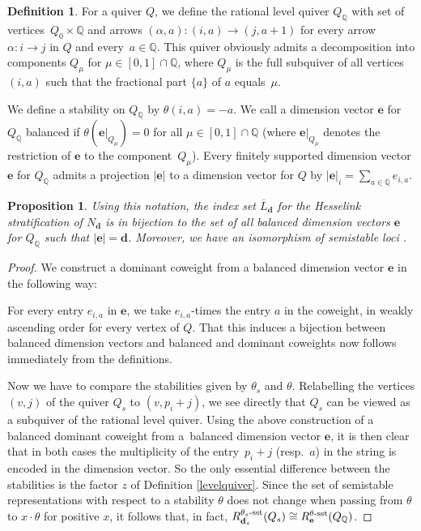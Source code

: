 \documentclass[pdftex]{sigma}
\numberwithin{equation}{section}
\newtheorem{Proposition}[Theorem]{Proposition}
\theoremstyle{definition}
\newtheorem{Definition}[Theorem]{Definition}
\begin{document}
\begin{Definition}
For a quiver $Q$, we define the rational level quiver $Q_{\mathbb{Q}}$ with set of vertices~${Q_0 \times \mathbb{Q}}$ and arrows
$
(\alpha, a) \colon (i,a) \rightarrow (j, a+1)
$
for every arrow~${\alpha\colon i \rightarrow j}$ in $Q$ and every~${a \in \mathbb{Q}}$. This quiver obviously admits a decomposition into components $Q_{\mu}$ for $\mu \in [0,1] \cap \mathbb{Q}$, where $Q_{\mu}$ is the full subquiver of all vertices $(i,a)$ such that the fractional part $\{a\}$ of $a$ equals~$\mu$.

We define a stability on $Q_{\mathbb{Q}}$ by $\theta(i,a) = -a$.
We call a dimension vector $\mathbf{e}$ for $Q_\mathbb{Q}$ balanced if $\theta(\mathbf{e}|_{Q_\mu})=0$
for all $\mu\in[0,1]\cap\mathbb{Q}$ (where $\mathbf{e}|_{Q_\mu}$ denotes the restriction of $\mathbf{e}$ to the component~$Q_\mu$). Every finitely supported dimension vector $\mathbf{e}$ for $Q_\mathbb{Q}$ admits a projection $|\mathbf{e}|$ to a dimension vector for $Q$ by $|\mathbf{e}|_i=\sum_{a\in\mathbb{Q}}e_{i,a}.$
\end{Definition}

\begin{Proposition}\label{pro par1}
Using this notation, the index set ${\overline{L}_{\mathbf{d}}}$ for the Hesselink stratification of $N_{\mathbf{d}}$ is in bijection to the set of all balanced dimension vectors $\mathbf{e}$ for $Q_\mathbb{Q}$ such that $|\mathbf{e}|=\mathbf{d}$. Moreover, we have an isomorphism of semistable loci .
\end{Proposition}

\begin{proof}
We construct a dominant coweight from a balanced dimension vector $\mathbf{e}$ in the following way:

For every entry $e_{i,a}$ in $\mathbf{e}$, we take $e_{i,a}$-times the entry $a$ in the coweight, in weakly ascending order for every vertex of $Q$. That this induces a bijection between balanced dimension vectors and balanced and dominant coweights now follows immediately from the definitions.

Now we have to compare the stabilities given by $\theta_s$ and $\theta$. Relabelling the vertices $(v,j)$ of the quiver $Q_s$ to $(v, p_i+j)$, we see directly that $Q_s$ can be viewed as a subquiver of the rational level quiver. Using the above construction of a balanced dominant coweight from a~balanced dimension vector $\mathbf{e}$, it is then clear that in both cases the multiplicity of the entry~${p_i +j}$ (resp.~$a$) in the string is encoded in the dimension vector. So the only essential difference between the stabilities is the factor $z$ of Definition \ref{levelquiver}. Since the set of semistable representations with respect to a stability $\theta$ does not change when passing from $\theta$ to $x \cdot \theta$ for positive $x$, it follows that, in fact, $R^{\theta_s\text{\rm -sst}}_{\mathbf{d}_s}(Q_s) \cong R^{\theta\text{\rm -sst}}_{\mathbf{e}}(Q_{\mathbb{Q}})$.
\end{proof}
\end{document}
